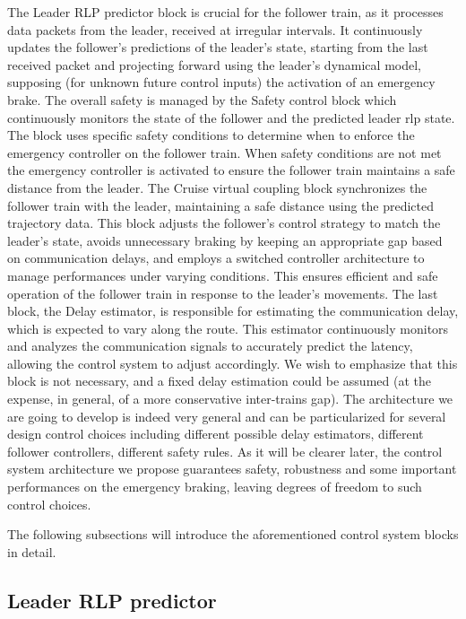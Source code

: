 The Leader RLP predictor block is crucial for the follower train, as it processes data packets from the leader, received at irregular intervals. It continuously updates the follower's predictions of the leader's state, starting from the last received packet and projecting forward using the leader’s dynamical model, supposing (for unknown future control inputs) the activation of an emergency brake. The overall safety is managed by the Safety control block which continuously monitors the state of the follower and the predicted leader \gls{rlp} state. The block uses specific safety conditions to determine when to enforce the emergency controller on the follower train. When safety conditions are not met the emergency controller is activated to ensure the follower train maintains a safe distance from the leader. The Cruise virtual coupling block synchronizes the follower train with the leader, maintaining a safe distance using the predicted trajectory data. This block adjusts the follower's control strategy to match the leader's state, avoids unnecessary braking by keeping an appropriate gap based on communication delays, and employs a switched controller architecture to manage performances under varying conditions. This ensures efficient and safe operation of the follower train in response to the leader's movements. The last block, the Delay estimator, is responsible for estimating the communication delay, which is expected to vary along the route. This estimator continuously monitors and analyzes the communication signals to accurately predict the latency, allowing the control system to adjust accordingly. We wish to emphasize that this block is not necessary, and a fixed delay estimation could be assumed (at the expense, in general, of a more conservative inter-trains gap). The architecture we are going to develop is indeed very general and can be particularized for several design control choices including different possible delay estimators, different follower controllers, different safety rules. As it will be clearer later, the control system architecture we propose guarantees safety, robustness and some important performances on the emergency braking, leaving degrees of freedom to such control choices.

The following subsections will introduce the aforementioned control system blocks in detail. 





\subsection{Leader RLP predictor}
\label{subsec:leaderRLPpredictor}

